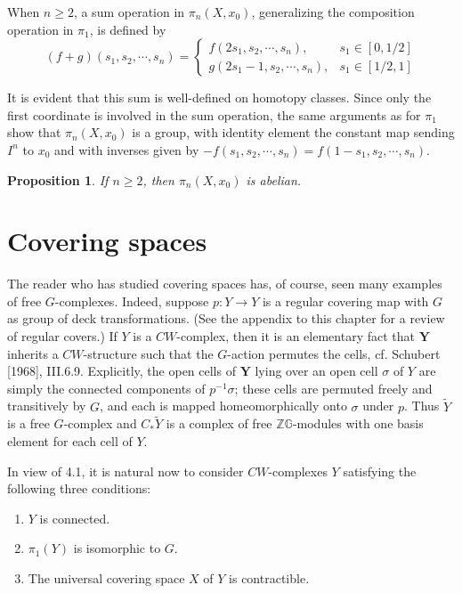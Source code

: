 \documentclass{book}
\newtheorem{prop}{Proposition}
\begin{document}
When $n \geq 2$, a sum operation in $\pi_n\left(X, x_0\right)$, generalizing the composition operation in $\pi_1$, is defined by
$$
(f+g)\left(s_1, s_2, \cdots, s_n\right)= \begin{cases}f\left(2 s_1, s_2, \cdots, s_n\right), & s_1 \in[0,1 / 2] \\ g\left(2 s_1-1, s_2, \cdots, s_n\right), & s_1 \in[1 / 2,1]\end{cases}
$$

It is evident that this sum is well-defined on homotopy classes. Since only the first coordinate is involved in the sum operation, the same arguments as for $\pi_1$ show that $\pi_n\left(X, x_0\right)$ is a group, with identity element the constant map sending $I^n$ to $x_0$ and with inverses given by $-f\left(s_1, s_2, \cdots, s_n\right)=f\left(1-s_1, s_2, \cdots, s_n\right)$.


\begin{prop}
    If $n \geq 2$, then $\pi_n\left(X, x_0\right)$ is abelian.
\end{prop}


\section{Covering spaces}

The reader who has studied covering spaces has, of course, seen many examples of free $G$-complexes. Indeed, suppose $p: Y \rightarrow Y$ is a regular covering map with $G$ as group of deck transformations. (See the appendix to this chapter for a review of regular covers.) If $Y$ is a $C W$-complex, then it is an elementary fact that $\boldsymbol{Y}$ inherits a $C W$-structure such that the $G$-action permutes the cells, cf. Schubert [1968], III.6.9. Explicitly, the open cells of $\boldsymbol{Y}$ lying over an open cell $\sigma$ of $Y$ are simply the connected components of $p^{-1} \sigma$; these cells are permuted freely and transitively by $G$, and each is mapped homeomorphically onto $\sigma$ under $p$. Thus $\tilde{Y}$ is a free $G$-complex and $C_* \tilde{Y}$ is a complex of free $\mathbb{Z G}$-modules with one basis element for each cell of $Y$.

In view of 4.1, it is natural now to consider $C W$-complexes $Y$ satisfying the following three conditions:
\begin{enumerate}
    \item $Y$ is connected.
    \item $\pi_1(Y)$ is isomorphic to $G$.
    \item The universal covering space $X$ of $Y$ is contractible.
\end{enumerate}
\end{document}
